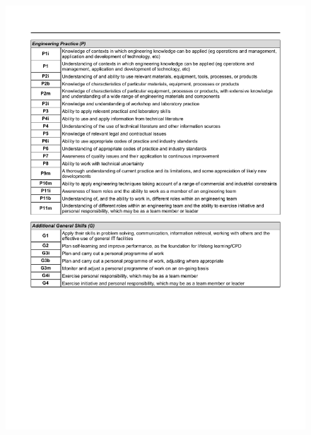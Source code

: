 \newpage
\begin{figure}
	\centering
	\includegraphics[height=\textheight]{Appendices/ECLO3.pdf}
\end{figure}